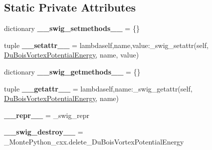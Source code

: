 \subsection*{Static Private Attributes}
\begin{DoxyCompactItemize}
\item 
\hypertarget{classMontePython__cxx_1_1DuBoisVortexPotentialEnergy_ad7d505785f4e3b3955bd01d6cebe19a2}{}dictionary {\bfseries \+\_\+\+\_\+swig\+\_\+setmethods\+\_\+\+\_\+} = \{\}\label{classMontePython__cxx_1_1DuBoisVortexPotentialEnergy_ad7d505785f4e3b3955bd01d6cebe19a2}

\item 
\hypertarget{classMontePython__cxx_1_1DuBoisVortexPotentialEnergy_aaf882c179de55b9d16aecf4c48099204}{}tuple {\bfseries \+\_\+\+\_\+setattr\+\_\+\+\_\+} = lambdaself,name,value\+:\+\_\+swig\+\_\+setattr(self, \hyperlink{classMontePython__cxx_1_1DuBoisVortexPotentialEnergy}{Du\+Bois\+Vortex\+Potential\+Energy}, name, value)\label{classMontePython__cxx_1_1DuBoisVortexPotentialEnergy_aaf882c179de55b9d16aecf4c48099204}

\item 
\hypertarget{classMontePython__cxx_1_1DuBoisVortexPotentialEnergy_ae02ea0c6be3d7f1b2d1b78c02641dd68}{}dictionary {\bfseries \+\_\+\+\_\+swig\+\_\+getmethods\+\_\+\+\_\+} = \{\}\label{classMontePython__cxx_1_1DuBoisVortexPotentialEnergy_ae02ea0c6be3d7f1b2d1b78c02641dd68}

\item 
\hypertarget{classMontePython__cxx_1_1DuBoisVortexPotentialEnergy_aa193df97e843c1273b77eea21857e080}{}tuple {\bfseries \+\_\+\+\_\+getattr\+\_\+\+\_\+} = lambdaself,name\+:\+\_\+swig\+\_\+getattr(self, \hyperlink{classMontePython__cxx_1_1DuBoisVortexPotentialEnergy}{Du\+Bois\+Vortex\+Potential\+Energy}, name)\label{classMontePython__cxx_1_1DuBoisVortexPotentialEnergy_aa193df97e843c1273b77eea21857e080}

\item 
\hypertarget{classMontePython__cxx_1_1DuBoisVortexPotentialEnergy_a71b13419fb64ca1d96b3e42b3bc0ee72}{}{\bfseries \+\_\+\+\_\+repr\+\_\+\+\_\+} = \+\_\+swig\+\_\+repr\label{classMontePython__cxx_1_1DuBoisVortexPotentialEnergy_a71b13419fb64ca1d96b3e42b3bc0ee72}

\item 
\hypertarget{classMontePython__cxx_1_1DuBoisVortexPotentialEnergy_a394c1ee60ee4c0f2c86cab93387d0b4b}{}{\bfseries \+\_\+\+\_\+swig\+\_\+destroy\+\_\+\+\_\+} = \+\_\+\+Monte\+Python\+\_\+cxx.\+delete\+\_\+\+Du\+Bois\+Vortex\+Potential\+Energy\label{classMontePython__cxx_1_1DuBoisVortexPotentialEnergy_a394c1ee60ee4c0f2c86cab93387d0b4b}

\end{DoxyCompactItemize}


